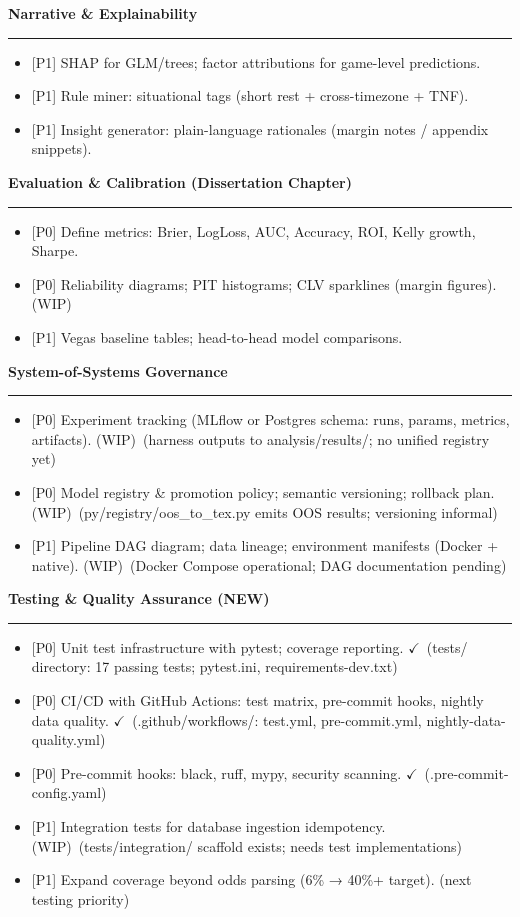 \documentclass[11pt]{article}
\newcommand{\milestone}[1]{\vspace{0.5em}\noindent\textbf{\large #1}\par\vspace{0.25em}\hrule\vspace{0.5em}}
\newcommand{\done}{\textcolor{green!60!black}{\(\checkmark\)}}
\newcommand{\wip}{\textcolor{orange!80!black}{(WIP)}}
\newcommand{\prio}[1]{\textcolor{blue!70!black}{[#1]}}
\begin{document}
\begin{itemize}
\milestone{Narrative \& Explainability}
\begin{itemize}
  \item \prio{P1} SHAP for GLM/trees; factor attributions for game-level predictions.
  \item \prio{P1} Rule miner: situational tags (short rest + cross-timezone + TNF).
  \item \prio{P1} Insight generator: plain-language rationales (margin notes / appendix snippets).
\end{itemize}

\milestone{Evaluation \& Calibration (Dissertation Chapter)}
\begin{itemize}
  \item \prio{P0} Define metrics: Brier, LogLoss, AUC, Accuracy, ROI, Kelly growth, Sharpe.
  \item \prio{P0} Reliability diagrams; PIT histograms; CLV sparklines (margin figures). \wip
  \item \prio{P1} Vegas baseline tables; head-to-head model comparisons.
\end{itemize}

\milestone{System-of-Systems Governance}
\begin{itemize}
  \item \prio{P0} Experiment tracking (MLflow or Postgres schema: runs, params, metrics, artifacts). \wip\ (harness outputs to analysis/results/; no unified registry yet)
  \item \prio{P0} Model registry \& promotion policy; semantic versioning; rollback plan. \wip\ (py/registry/oos\_to\_tex.py emits OOS results; versioning informal)
  \item \prio{P1} Pipeline DAG diagram; data lineage; environment manifests (Docker + native). \wip\ (Docker Compose operational; DAG documentation pending)
\end{itemize}

\milestone{Testing \& Quality Assurance (NEW)}
\begin{itemize}
  \item \prio{P0} Unit test infrastructure with pytest; coverage reporting. \done\ (tests/ directory: 17 passing tests; pytest.ini, requirements-dev.txt)
  \item \prio{P0} CI/CD with GitHub Actions: test matrix, pre-commit hooks, nightly data quality. \done\ (.github/workflows/: test.yml, pre-commit.yml, nightly-data-quality.yml)
  \item \prio{P0} Pre-commit hooks: black, ruff, mypy, security scanning. \done\ (.pre-commit-config.yaml)
  \item \prio{P1} Integration tests for database ingestion idempotency. \wip\ (tests/integration/ scaffold exists; needs test implementations)
  \item \prio{P1} Expand coverage beyond odds parsing (6\% → 40\%+ target). (next testing priority)
\end{itemize}


\end{itemize}
\end{document}
